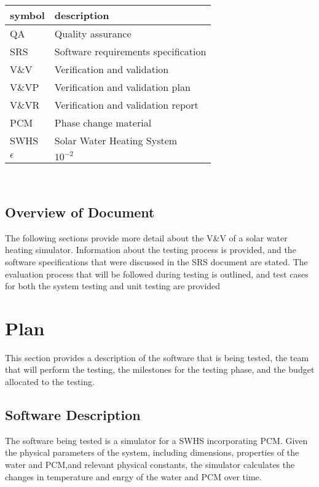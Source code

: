 \documentclass[12pt]{article}
\begin{document}
\renewcommand{\arraystretch}{1.2}
\begin{tabular}{l l} 
  \toprule		
  \textbf{symbol} & \textbf{description}\\
  \midrule 
  QA		&Quality assurance\\
  SRS		&Software requirements specification\\
  V\&V		& Verification and validation\\
  V\&VP 	& Verification and validation plan\\
  V\&VR 	& Verification and validation report\\
  PCM		& Phase change material\\
  SWHS		& Solar Water Heating System\\
  $\epsilon$& $10^{-2}$\\
  \bottomrule
\end{tabular}\\

\subsection{Overview of Document }
The following sections provide more detail about the V\&V of a solar water heating
 simulator. Information about the testing process is provided, and the software specifications
that were discussed in the SRS document are stated.  The evaluation process that will be followed during 
testing is outlined, and test cases for both the system testing and unit testing are provided 

%
%

\section{Plan}
This section provides a description of the software that is being tested, the team that will
perform the testing, the milestones for the testing phase, and the budget allocated to the testing. 

\subsection{Software Description}
The software being tested is a simulator for a SWHS
incorporating PCM. Given the physical parameters of the system,
 including dimensions, properties of the water and PCM,and relevant physical constants,
  the simulator calculates the changes in temperature and enrgy of the water and PCM 
  over time.
\end{document}
